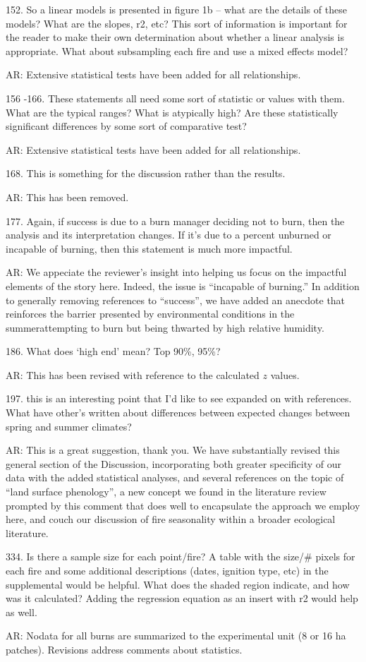 \documentclass[parskip=half, american]{scrartcl}
\newcommand{\AR}[1]
	{\color{PineGreen}AR: #1\color{black} \par }
\begin{document}
152.  So a linear models is presented in figure 1b – what are the details of these models?  What are the slopes, r2,  etc?  This sort of information is important for the reader to make their own determination about whether a linear analysis is appropriate.  What about subsampling each fire and use a mixed effects model? 

\AR{ Extensive statistical tests have been added for all relationships. }

156 -166.  These statements all need some sort of statistic or values with them.  What are the typical ranges? What is atypically high?  Are these statistically significant differences by some sort of comparative test? 

\AR{Extensive statistical tests have been added for all relationships.  }

168.  This is something for the discussion rather than the results. 

\AR{This has been removed.  }

177.  Again, if success is due to a burn manager deciding not to burn, then the analysis and its interpretation changes.  If it’s due to a percent unburned or incapable of burning, then this statement is much more impactful. 

\AR{ We appeciate the reviewer's insight into helping us focus on the impactful elements of the story here. 
Indeed, the issue is ``incapable of burning.''
In addition to generally removing references to ``success'', we have added an anecdote that reinforces the barrier presented by environmental conditions in the summer\textemdash attempting to burn but being thwarted by high relative humidity. }

186.  What does `high end' mean? Top 90\%, 95\%?  

\AR{This has been revised with reference to the calculated $z$ values. }

197.  this is an interesting point that I’d like to see expanded on with references.  What have other’s written about differences between expected changes between spring and summer climates?

\AR{This is a great suggestion, thank you. 
We have substantially revised this general section of the Discussion, incorporating both greater specificity of our data with the added statistical analyses, and several references on the topic of ``land surface phenology'', a new concept we found in the literature review prompted by this comment that does well to encapsulate the approach we employ here, and couch our discussion of fire seasonality within a broader ecological literature.  }

334. Is there a sample size for each point/fire? A table with the size/\# pixels for each fire and some additional descriptions (dates, ignition type, etc) in the supplemental would be helpful. What does the shaded region indicate, and how was it calculated? Adding the regression equation as an insert with r2 would help as well.

\AR{No\textemdash data for all burns are summarized to the experimental unit (8 or 16 ha patches). 
Revisions address comments about statistics.   }
\end{document}
